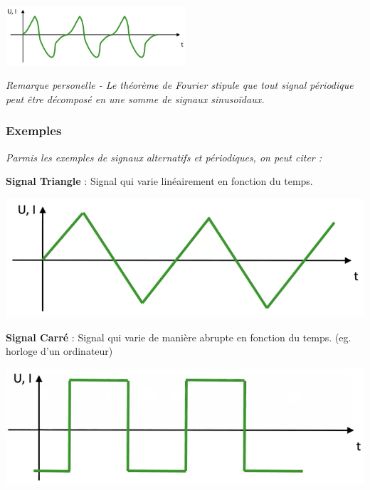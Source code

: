 \begin{center}
    \includegraphics[width=0.5\textwidth]{chapters/chapter1/images/quelconque.png}
\end{center}
\textit{Remarque personelle - Le théorème de Fourier stipule que tout signal périodique peut être décomposé en une somme de signaux sinusoïdaux.}
\subsubsection{Exemples}
\textit{Parmis les exemples de signaux alternatifs et périodiques, on peut citer :} \\
\vspace{5px}
\begin{minipage}[htp]{0.45\textwidth}
\textbf{Signal Triangle} : Signal qui varie linéairement en fonction du temps. \\
\vspace{4ex}
\begin{center}
    \includegraphics[width=\textwidth]{chapters/chapter1/images/triangle.png}
\end{center}
\end{minipage}
\hfill
\vline
\hfill
\begin{minipage}[htp]{0.45\textwidth}
\textbf{Signal Carré} : Signal qui varie de manière abrupte en fonction du temps. (eg. horloge d'un ordinateur)\\
\begin{center}
    \includegraphics[width=\textwidth]{chapters/chapter1/images/carre.png}
\end{center}
\end{minipage}
